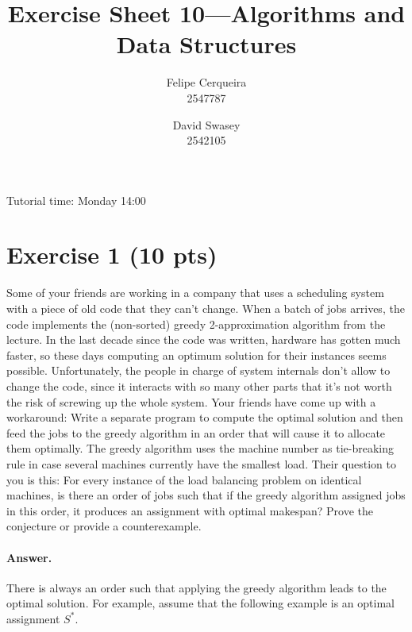 \documentclass[a4paper]{article}
\title{Exercise Sheet 10---Algorithms and Data Structures}
\author{Felipe Cerqueira \\ 2547787 \and David Swasey \\ 2542105}
\begin{document}
\maketitle

Tutorial time: Monday 14:00



\section*{Exercise 1 (10 pts)}

Some of your friends are working in a company that uses a scheduling system with a piece of old code that they can't change. When a batch of jobs arrives, the code implements the (non-sorted) greedy 2-approximation algorithm from the lecture. In the last decade since the code was written, hardware has gotten much faster, so these days computing an optimum solution for their instances seems possible. Unfortunately, the people in charge of system internals don’t allow to change the code, since it interacts with so many other parts that it’s not worth the risk of screwing up the whole system.
Your friends have come up with a workaround: Write a separate program to compute the optimal solution and then feed the jobs to the greedy algorithm in an order that will cause it to allocate them optimally. The greedy algorithm uses the machine number as tie-breaking rule in case several machines currently have the smallest load. Their question to you is this: For every instance of the load balancing problem on identical machines, is there an order of jobs such that if the greedy algorithm assigned jobs in this order, it produces an assignment with optimal makespan?
Prove the conjecture or provide a counterexample.

\paragraph{Answer.}

There is always an order such that applying the greedy algorithm leads to the optimal solution.
For example, assume that the following example is an optimal assignment $S^\ast$. 
\end{document}
